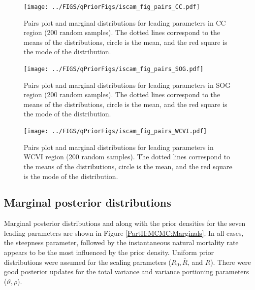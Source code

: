 \begin{figure}[!tbp]
	\texttt{[image: ../FIGS/qPriorFigs/iscam\_fig\_pairs\_CC.pdf]}\\
	\caption{Pairs plot and marginal distributions for leading parameters in CC region (200 random samples).  The dotted lines correspond to the means of the distributions, circle is the mean, and the red square is the mode of the distribution.}\label{PartII:MCMC:pairsCC}
\end{figure}

\begin{figure}[!tbp]
	\texttt{[image: ../FIGS/qPriorFigs/iscam\_fig\_pairs\_SOG.pdf]}\\
	\caption{Pairs plot and marginal distributions for leading parameters in SOG region (200 random samples).  The dotted lines correspond to the means of the distributions, circle is the mean, and the red square is the mode of the distribution.}\label{PartII:MCMC:pairsSOG}
\end{figure}

\begin{figure}[!tbp]
	\texttt{[image: ../FIGS/qPriorFigs/iscam\_fig\_pairs\_WCVI.pdf]}\\
	\caption{Pairs plot and marginal distributions for leading parameters in WCVI region (200 random samples).  The dotted lines correspond to the means of the distributions, circle is the mean, and the red square is the mode of the distribution.}\label{PartII:MCMC:pairsWCVI}
\end{figure}

\subsection{Marginal posterior distributions}

Marginal posterior distributions and along with the prior densities for the seven leading parameters are shown in Figure \ref{PartII:MCMC:Marginals}. In all cases, the steepness parameter, followed by the instantaneous natural mortality rate appears to be the most influenced by the prior density. Uniform prior distributions were assumed for the scaling parameters ($R_0, \bar{R}$, and $\ddot{R}$).  There were good posterior updates for the total variance and variance portioning parameters ($\vartheta, \rho$).

